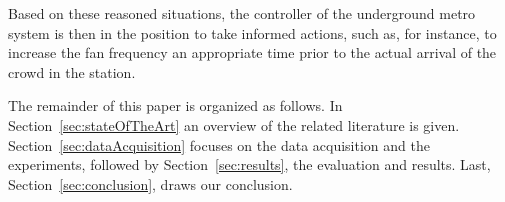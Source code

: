 Based on these reasoned situations, the controller of the underground metro system is then in the position to take informed actions, such as, for instance, to increase the fan frequency an appropriate time prior to the actual arrival of the crowd in the station.


The remainder of this paper is organized as follows. In Section~\ref{sec:stateOfTheArt} an overview of the related literature is given. Section~\ref{sec:dataAcquisition} focuses on the data acquisition and the experiments, followed by Section~\ref{sec:results}, the evaluation and results. Last, Section~\ref{sec:conclusion}, draws our conclusion.
